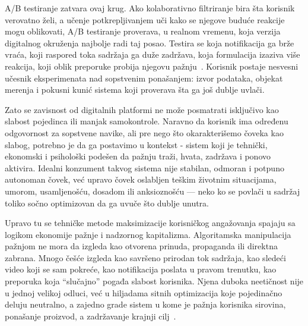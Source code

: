 A/B testiranje zatvara ovaj krug. Ako kolaborativno filtriranje bira šta korisnik verovatno želi, a učenje potkrepljivanjem uči kako se njegove buduće reakcije mogu oblikovati, A/B testiranje proverava, u realnom vremenu, koja verzija digitalnog okruženja najbolje radi taj posao. Testira se koja notifikacija ga brže vraća, koji raspored toka sadržaja ga duže zadržava, koja formulacija izaziva više reakcija, koji oblik preporuke probija njegovu pažnju~\cite{kohavi2017online}. Korisnik postaje nesvesni učesnik eksperimenata nad sopstvenim ponašanjem: izvor podataka, objekat merenja i pokusni kunić sistema koji proverava šta ga još dublje uvlači.

Zato se zavisnost od digitalnih platformi ne može posmatrati isključivo kao slabost pojedinca ili manjak samokontrole. Naravno da korisnik ima određenu odgovornost za sopstvene navike, ali pre nego što okarakterišemo čoveka kao slabog, potrebno je da ga postavimo u kontekst - sistem koji je tehnički, ekonomski i psihološki podešen da pažnju traži, hvata, zadržava i ponovo aktivira. Idealni konzument takvog sistema nije stabilan, odmoran i potpuno autonoman čovek, već upravo čovek oslabljen teškim životnim situacijama, umorom, usamljenošću, dosadom ili anksioznošću — neko ko se povlači u sadržaj toliko sočno optimizovan da ga uvuče što dublje unutra.

Upravo tu se tehničke metode maksimizacije korisničkog angažovanja spajaju sa logikom ekonomije pažnje i nadzornog kapitalizma. Algoritamska manipulacija pažnjom ne mora da izgleda kao otvorena prinuda, propaganda ili direktna zabrana. Mnogo češće izgleda kao savršeno prirodan tok sadržaja, kao sledeći video koji se sam pokreće, kao notifikacija poslata u pravom trenutku, kao preporuka koja “slučajno” pogađa slabost korisnika. Njena duboka neetičnost nije u jednoj velikoj odluci, već u hiljadama sitnih optimizacija koje pojedinačno deluju neutralno, a zajedno grade sistem u kome je pažnja korisnika sirovina, ponašanje proizvod, a zadržavanje krajnji cilj~\cite{gonzalez2024attention}.